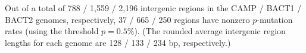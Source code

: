 Out of a total of 788 / 1,559 / 2,196 intergenic regions in the CAMP / BACT1 / BACT2 genomes, respectively, 37 / 665 / 250 regions have nonzero $p$-mutation rates (using the threshold $p=0.5\%$). (The rounded average intergenic region lengths for each genome are 128 / 133 / 234 bp, respectively.)\endinput